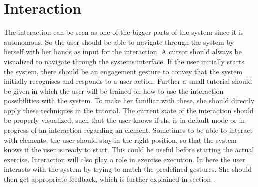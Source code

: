 \section{Interaction}\label{4_2_interaction}
The interaction can be seen as one of the bigger parts of the system since it is autonomous. So the user should be able to navigate through the system by herself with her hands as input for the interaction. A cursor should always be visualized to navigate through the systems interface. If the user initially starts the system, there should be an engagement gesture to convey that the system initially recognises and responds to a user action. Further a small tutorial should be given in which the user will be trained on how to use the interaction possibilities with the system. To make her familiar with these, she should directly apply these techniques in the tutorial. The current state of the interaction should be properly visualized, such that the user knows if she is in default mode or in progress of an interaction regarding an element. Sometimes to be able to interact with elements, the user should stay in the right position, so that the system knows if the user is ready to start. This could be useful before starting the actual exercise. Interaction will also play a role in exercise execution. In here the user interacts with the system by trying to match the predefined gestures. She should then get appropriate feedback, which is further explained in section \textit{}.

\begin{comment}
- user can and should interact with the system
\\- Cursor visualization as hand image
\\- Engagement gesture for first interaction with Kinect (One hand over shoulder)
\\- She should be instructed how to interact 
\\- Different interaction methods should be provided to prevent failing on one (tutorial --> clicking (variations) + scrolling)
\end{comment}